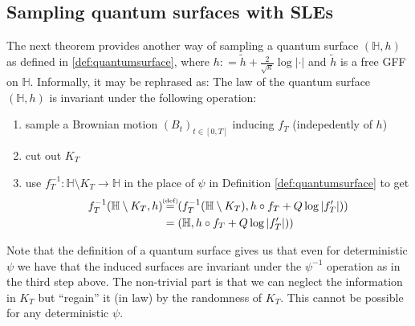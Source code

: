 \documentclass[11pt,reqno]{amsart}
\numberwithin{equation}{section}
\newtheorem{thm}{Theorem}[section]
\newtheorem{rem}[thm]{Remark}
\newcommand{\eqbydef}{\mathrel{\stackrel{\hspace*{-3mm}\text{\tiny(def)}\hspace*{-3mm}}{=}}}
\newcommand{\deq}{\mathrel{\mathop:}=}
\newcommand{\eps}{\varepsilon}
\begin{document}
\subsection{Sampling quantum surfaces with SLEs}
The next theorem provides another way of sampling a quantum surface $(\mathbb H,h)$ as defined in \ref{def:quantumsurface}, where $h\deq \tilde h+\frac{2}{\sqrt\kappa}\log|\cdot|$ and $\tilde h$ is a free GFF on $\mathbb H$. Informally, it may be rephrased as:
The law of the quantum surface $(\mathbb H,h)$ is invariant under the following operation:
\begin{enumerate}
	\item sample a Brownian motion $(B_t)_{t\in[0,T]}$ inducing $f_T$ (indepedently of $h$)
	\item cut out $K_T$
	\item use $f_T^{-1}:\mathbb H\setminus K_T\rightarrow\mathbb H$ in the place of $\psi$ in Definition \ref{def:quantumsurface} to get \begin{align*}
			f_T^{-1}(\mathbb H\setminus K_T, h)&\eqbydef (f_T^{-1}(\mathbb H\setminus K_T),h\circ f_T+Q\log|f'_T|))\\ &= (\mathbb H,h\circ f_T+Q\log|f'_T|))
		\end{align*}
\end{enumerate}
Note that the definition of a quantum surface gives us that even for deterministic $\psi$ we have that the induced surfaces are invariant under the $\psi^{-1}$ operation as in the third step above. The non-trivial part is that we can neglect the information in $K_T$ but ``regain'' it (in law) by the randomness of $K_T$. This cannot be possible for any deterministic $\psi$.



	
	

\end{document}
